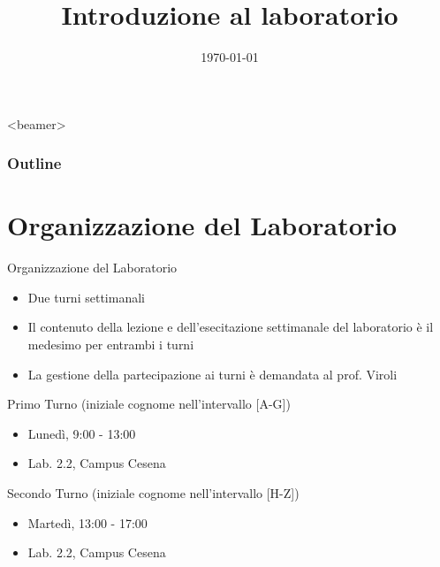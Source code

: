 \documentclass[xcolor=dvipsnames,presentation]{beamer}
\title[{\lab} -- Introduzione]{Introduzione al laboratorio}
\date[\today]{\today}
\begin{document}
\frame[label=coverpage]{\titlepage}

\begin{frame}<beamer>
	\frametitle{Outline}
	\tableofcontents[]
\end{frame}

\section{Organizzazione del Laboratorio}\label{sec:organizzazione-del-laboratorio}

\begin{frame}{Organizzazione del Laboratorio}
    \begin{itemize}
        \item Due turni settimanali
        \item Il contenuto della lezione e dell'esecitazione settimanale del laboratorio è il medesimo per entrambi i turni
        \item La gestione della partecipazione ai turni è demandata al prof. Viroli
    \end{itemize}
    \begin{block}{Primo Turno (iniziale cognome nell'intervallo [A-G])}
        \begin{itemize}
            \item Lunedì, 9:00 - 13:00
            \item Lab. 2.2, Campus Cesena
        \end{itemize}
    \end{block}
    \begin{block}{Secondo Turno (iniziale cognome nell'intervallo [H-Z])}
        \begin{itemize}
            \item Martedì, 13:00 - 17:00
            \item Lab. 2.2, Campus Cesena
        \end{itemize}
    \end{block}
\end{frame}

\end{document}
